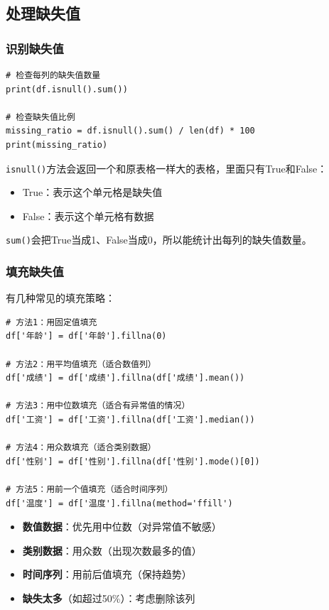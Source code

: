 \documentclass[12pt,a4paper]{article}
\begin{document}
\subsection{处理缺失值}

\subsubsection{识别缺失值}

\begin{lstlisting}[caption={检查缺失值}]
# 检查每列的缺失值数量
print(df.isnull().sum())

# 检查缺失值比例
missing_ratio = df.isnull().sum() / len(df) * 100
print(missing_ratio)
\end{lstlisting}

\begin{knowledgebox}
\texttt{isnull()}方法会返回一个和原表格一样大的表格，里面只有True和False：
\begin{itemize}
    \item True：表示这个单元格是缺失值
    \item False：表示这个单元格有数据
\end{itemize}

\texttt{sum()}会把True当成1、False当成0，所以能统计出每列的缺失值数量。
\end{knowledgebox}

\subsubsection{填充缺失值}

有几种常见的填充策略：

\begin{lstlisting}[caption={填充缺失值的方法}]
# 方法1：用固定值填充
df['年龄'] = df['年龄'].fillna(0)

# 方法2：用平均值填充（适合数值列）
df['成绩'] = df['成绩'].fillna(df['成绩'].mean())

# 方法3：用中位数填充（适合有异常值的情况）
df['工资'] = df['工资'].fillna(df['工资'].median())

# 方法4：用众数填充（适合类别数据）
df['性别'] = df['性别'].fillna(df['性别'].mode()[0])

# 方法5：用前一个值填充（适合时间序列）
df['温度'] = df['温度'].fillna(method='ffill')
\end{lstlisting}

\begin{tipbox}[选择填充策略的建议]
\begin{itemize}
    \item \textbf{数值数据}：优先用中位数（对异常值不敏感）
    \item \textbf{类别数据}：用众数（出现次数最多的值）
    \item \textbf{时间序列}：用前后值填充（保持趋势）
    \item \textbf{缺失太多}（如超过50\%）：考虑删除该列
\end{itemize}
\end{tipbox}
\end{document}
